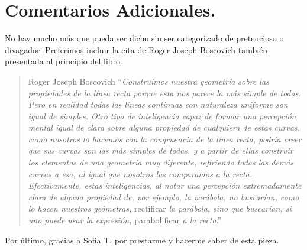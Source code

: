 \section{Comentarios Adicionales.}

No hay mucho más que pueda ser dicho sin ser categorizado de pretencioso o divagador. Preferimos incluir la cita de Roger Joseph Boscovich también presentada al principio del libro.

\begin{quote}{Roger Joseph Boscovich}
	\enquote{\textit{Construímos nuestra geometría sobre las propiedades de la línea recta porque esta nos parece la más simple de todas. Pero en realidad todas las líneas continuas con naturaleza uniforme son igual de simples. Otro tipo de inteligencia capaz de formar una percepción mental igual de clara sobre alguna propiedad de cualquiera de estas curvas, como nosotros lo hacemos con la congruencia de la línea recta, podría creer que sus curvas son las más simples de todas, y a partir de ellas construir los elementos de una geometría muy diferente, refiriendo todas las demás curvas a esa, al igual que nosotros las comparamos a la recta. Efectivamente, estas inteligencias, al notar una percepción extremadamente clara de alguna propiedad de, por ejemplo, la parábola, no buscarían, como lo hacen nuestros geómetras,} rectificar \textit{la parábola, sino que buscarían, si uno puede usar la expresión,} parabolificar \textit{a la recta}.}
\end{quote}

Por último, gracias a Sofia T. por prestarme y hacerme saber de esta pieza.
